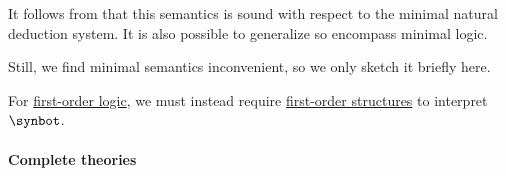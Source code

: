 \begin{remark}
  It follows from  that this semantics is sound with respect to the minimal natural deduction system. It is also possible to generalize  so encompass minimal logic.

  Still, we find minimal semantics inconvenient, so we only sketch it briefly here.
\end{remark}
\begin{comments}
  \item For \hyperref[def:first_order_logic]{first-order logic}, we must instead require \hyperref[def:fol_structure]{first-order structures} to interpret \( \synbot \).
\end{comments}

\paragraph{Complete theories}

